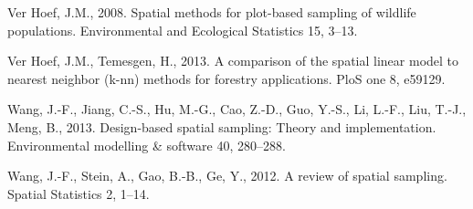 \documentclass[]{elsarticle} %
\begin{document}
\leavevmode\hypertarget{ref-verhoef2008spatial}{}%
Ver Hoef, J.M., 2008. Spatial methods for plot-based sampling of
wildlife populations. Environmental and Ecological Statistics 15, 3--13.

\leavevmode\hypertarget{ref-ver2013comparison}{}%
Ver Hoef, J.M., Temesgen, H., 2013. A comparison of the spatial linear
model to nearest neighbor (k-nn) methods for forestry applications. PloS
one 8, e59129.

\leavevmode\hypertarget{ref-wang2013design}{}%
Wang, J.-F., Jiang, C.-S., Hu, M.-G., Cao, Z.-D., Guo, Y.-S., Li, L.-F.,
Liu, T.-J., Meng, B., 2013. Design-based spatial sampling: Theory and
implementation. Environmental modelling \& software 40, 280--288.

\leavevmode\hypertarget{ref-wang2012review}{}%
Wang, J.-F., Stein, A., Gao, B.-B., Ge, Y., 2012. A review of spatial
sampling. Spatial Statistics 2, 1--14.
\end{document}
